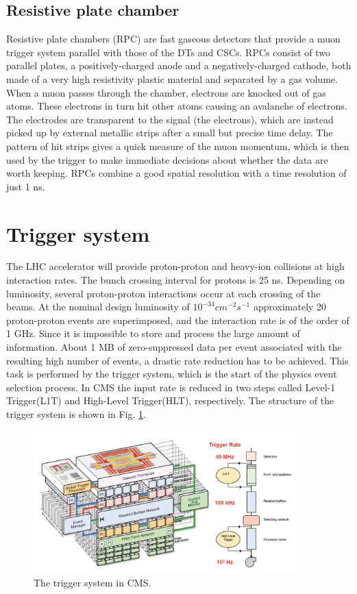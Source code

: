 \subsection*{Resistive plate chamber}
Resistive plate chambers (RPC) are fast gaseous detectors that provide a muon trigger system parallel with those of the DTs and CSCs.
RPCs consist of two parallel plates, a positively-charged anode and a negatively-charged cathode, both made of a very high resistivity plastic material and separated by a gas volume.
When a muon passes through the chamber, electrons are knocked out of gas atoms. These electrons in turn hit other atoms causing an avalanche of electrons. The electrodes are transparent to the signal (the electrons), which are instead picked up by external metallic strips after a small but precise time delay. The pattern of hit strips gives a quick measure of the muon momentum, which is then used by the trigger to make immediate decisions about whether the data are worth keeping. RPCs combine a good spatial resolution with a time resolution of just 1 ns.

\section{Trigger system}
The LHC accelerator will provide proton-proton and heavy-ion collisions at high interaction rates. The bunch
crossing interval for protons is 25 ns. Depending on luminosity, several proton-proton interactions occur at each
crossing of the beams. At the nominal design luminosity of $10^{-34} cm^{-2}s^{-1}$ approximately 20 proton-proton events
are superimposed, and the interaction rate is of the order of 1 GHz. Since it is impossible to store and process
the large amount of information. About 1 MB of zero-suppressed data per event associated with the resulting
high number of events, a drastic rate reduction has to be achieved. This task is performed by the trigger system,
which is the start of the physics event selection process. In CMS the input rate is reduced in two steps called
Level-1 Trigger(L1T) and High-Level Trigger(HLT), respectively. The structure of the trigger system is shown in Fig. \ref{fig:trigger}.  

\begin{figure}
 \begin{center}
  \includegraphics[width=0.9\textwidth]{plot/trigger.png}
 \end{center}
\caption{\label{fig:trigger}The trigger system in CMS.}
\end{figure}

